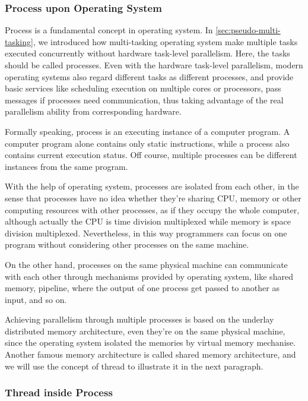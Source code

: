 \documentclass[12pt,a4paper]{report}
\begin{document}
\subsubsection{Process upon Operating System}

Process is a fundamental concept in operating system. In \ref{sec:pseudo-multi-tasking}, we introduced how multi-tasking operating system make multiple tasks executed concurrently without hardware task-level parallelism. Here, the tasks should be called processes. Even with the hardware task-level parallelism, modern operating systems also regard different tasks as different processes, and provide basic services like scheduling execution on multiple cores or processors, pass messages if processes need communication, thus taking advantage of the real parallelism ability from corresponding hardware.

Formally speaking, process is an executing instance of a computer program. A computer program alone contains only static instructions, while a process also contains current execution status. Off course, multiple processes can be different instances from the same program.

With the help of operating system, processes are isolated from each other, in the sense that processes have no idea whether they're sharing CPU, memory or other computing resources with other processes, as if they occupy the whole computer, although actually the CPU is time division multiplexed while memory is space division multiplexed. Nevertheless, in this way programmers can focus on one program without considering other processes on the same machine.

On the other hand, processes on the same physical machine can communicate with each other through mechanisms provided by operating system, like shared memory, pipeline, where the output of one process get passed to another as input, and so on.

Achieving parallelism through multiple processes is based on the underlay distributed memory architecture, even they're on the same physical machine, since the operating system isolated the memories by virtual memory mechanise. Another famous memory architecture is called shared memory architecture, and we will use the concept of thread to illustrate it in the next paragraph.

\subsubsection{Thread inside Process}
\end{document}
